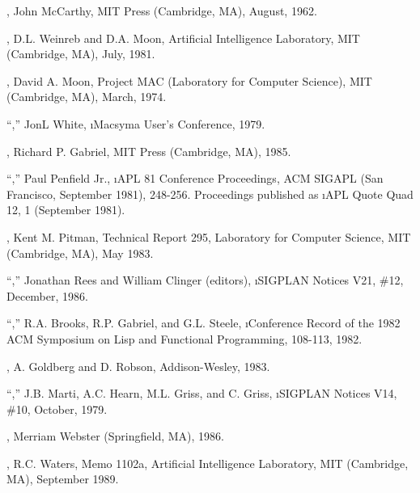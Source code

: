 \item{\bull} {\LispOnePointFive},
	John McCarthy, MIT Press (Cambridge, MA), August, 1962.

\item{\bull} {\Chinual},
	D.L. Weinreb and D.A. Moon,
	Artificial Intelligence Laboratory, MIT (Cambridge, MA), July, 1981.

\item{\bull} {\Moonual},
	David A. Moon, Project MAC (Laboratory for Computer Science),
        MIT (Cambridge, MA), March, 1974.

\item{\bull} ``{\NILReport},'' 
        JonL White, \i{Macsyma User's Conference}, 1979.

\item{\bull} {\GabrielBenchmarks},
	Richard P. Gabriel, MIT Press (Cambridge, MA), 1985.

\item{\bull} ``{\PrincipalValues},'' 
        Paul Penfield Jr., \i{APL 81 Conference Proceedings},
        ACM SIGAPL (San Francisco, September 1981), 248-256.
        Proceedings published as \i{APL Quote Quad 12}, 1 (September 1981).

\item{\bull} {\Pitmanual},
	Kent M. Pitman, 
	Technical Report 295,
	Laboratory for Computer Science, MIT (Cambridge, MA), May 1983.

\item{\bull} ``{\RevisedCubedScheme},''
        Jonathan Rees and William Clinger (editors), 
        \i{SIGPLAN Notices} V21, \#12, December, 1986.

\item{\bull} ``\SOneCLPaper,''
	R.A. Brooks, R.P. Gabriel, and G.L. Steele,
	\i{Conference Record of the 1982 ACM Symposium on Lisp and Functional Programming},
	108-113, 1982.

\item{\bull} \SmalltalkBook,
        A. Goldberg and D. Robson, Addison-Wesley, 1983.

\item{\bull} ``{\StandardLispReport},''
        J.B. Marti, A.C. Hearn, M.L. Griss, and C. Griss,
        \i{SIGPLAN Notices} V14, \#10, October, 1979.

\item{\bull} {\WebstersDictionary},
	Merriam Webster (Springfield, MA), 1986.

\item{\bull} \XPPaper,
        R.C. Waters,
	Memo 1102a,
	Artificial Intelligence Laboratory, MIT (Cambridge, MA), September 1989.

\endlist
